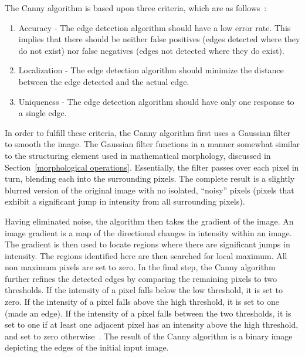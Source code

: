 \documentclass{sig-alternate}
\begin{document}
The Canny algorithm is based upon three criteria, which are as follows~\cite{Canny:1986, CannySummarized}:
\begin{enumerate}
\item Accuracy - The edge detection algorithm should have a low error rate. This implies that there should be neither false positives (edges detected where they do not exist) nor false negatives (edges not detected where they do exist).
\item Localization - The edge detection algorithm should minimize the distance between the edge detected and the actual edge.
\item Uniqueness - The edge detection algorithm should have only one response to a single edge.
\end{enumerate}

In order to fulfill these criteria, the Canny algorithm first uses a Gaussian filter to smooth the image. The Gaussian filter functions in a manner somewhat similar to the structuring element used in mathematical morphology, discussed in Section~\ref{morphological operations}. Essentially, the filter passes over each pixel in turn, blending each into the surrounding pixels. The complete result is a slightly blurred version of the original image with no isolated, ``noisy'' pixels (pixels that exhibit a significant jump in intensity from all surrounding pixels).

Having eliminated noise, the algorithm then takes the gradient of the image. An image gradient is a map of the directional changes in intensity within an image. The gradient is then used to locate regions where there are significant jumps in intensity. The regions identified here are then searched for local maximum. All non maximum pixels are set to zero. In the final step, the Canny algorithm further refines the detected edges by comparing the remaining pixels to two thresholds. If the intensity of a pixel falls below the low threshold, it is set to zero. If the intensity of a pixel falls above the high threshold, it is set to one (made an edge). If the intensity of a pixel falls between the two thresholds, it is set to one if at least one adjacent pixel has an intensity above the high threshold, and set to zero otherwise~\cite{CannySummarized}. The result of the Canny algorithm is a binary image depicting the edges of the initial input image.
\end{document}
